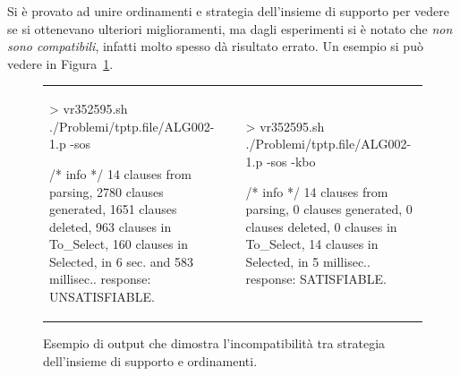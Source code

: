 \documentclass[a4paper,11pt]{article} %
\newcommand{\file}{\texttt}
\newenvironment{myfigure}[2]
  {\newcommand{\didascalia}{\caption{#1}}%
   \newcommand{\etichetta}{\label{#2}}%
   \begin{figure}[h!]\centering}
  {\didascalia\etichetta\end{figure}}
\begin{document}
Si è provato ad unire ordinamenti e strategia dell'insieme di supporto per vedere
se si ottenevano ulteriori miglioramenti, ma dagli esperimenti si è notato che 
\emph{non sono compatibili}, infatti molto spesso dà risultato errato.  
Un esempio si può vedere in Figura~\ref{fig: esempio incompatibilita}.
%
\begin{myfigure}{Esempio di output che dimostra l'incompatibilità tra 
strategia dell'insieme di supporto e ordinamenti.}{fig: esempio incompatibilita}
\begin{tabular}{p{}p{}p{}}
\footnotesize
\begin{shell}
> vr352595.sh 
  ./Problemi/tptp.file/ALG002-1.p 
  -sos

/* info */
14 clauses from parsing, 
2780 clauses generated, 
1651 clauses deleted, 
963 clauses in To_Select, 
160 clauses in Selected, 
in 6 sec. and 583 millisec..
response: UNSATISFIABLE.
\end{shell}
& &
\footnotesize
\begin{shell}
> vr352595.sh 
  ./Problemi/tptp.file/ALG002-1.p 
  -sos -kbo

/* info */
14 clauses from parsing, 
0 clauses generated, 
0 clauses deleted, 
0 clauses in To_Select, 
14 clauses in Selected, 
in 5 millisec..
response: SATISFIABLE.
\end{shell}
 \\
\end{tabular}
\end{myfigure}
%
%
%
%
%
%
%
\end{document}
